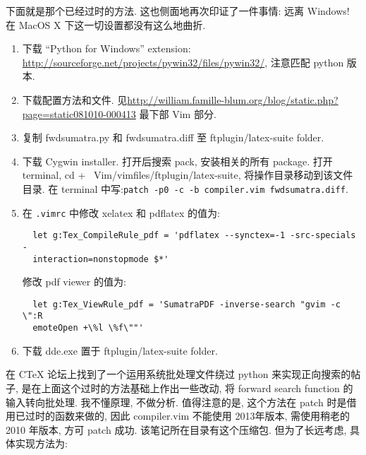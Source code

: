 \documentclass{article}
\begin{document}
下面就是那个已经过时的方法. 这也侧面地再次印证了一件事情: 远离 Windows! 在 MacOS X 下这一切设置都没有这么地曲折.
\begin{enumerate}
  \item 下载 ``Python for Windows'' extension: \hspace{15pt}\url{http://sourceforge.net/projects/pywin32/files/pywin32/}, 注意匹配 python 版本.
  \item 下载配置方法和文件. 见\hspace{15pt}\url{http://william.famille-blum.org/blog/static.php?page=static081010-000413} 最下部 Vim 部分.
\item 复制 fwdsumatra.py 和 fwdsumatra.diff 至 ftplugin/latex-suite folder.
\item 下载 Cygwin installer.  打开后搜索 pack, 安装相关的所有 package. 打开 terminal, cd + ~Vim/vimfiles/ftplugin/latex-suite, 将操作目录移动到该文件目录. 在 terminal 中写:\verb`patch -p0 -c -b compiler.vim fwdsumatra.diff`.
\item 在 \verb`.vimrc` 中修改 xelatex 和 pdflatex 的值为:
  \begin{verbatim}
  let g:Tex_CompileRule_pdf = 'pdflatex --synctex=-1 -src-specials -
  interaction=nonstopmode $*' 
  \end{verbatim}
  修改 pdf viewer 的值为:
  \begin{verbatim}
  let g:Tex_ViewRule_pdf = 'SumatraPDF -inverse-search "gvim -c \":R
  emoteOpen +\%l \%f\""'
  \end{verbatim}
\item 下载 dde.exe 置于 ftplugin/latex-suite folder.
\end{enumerate}
在 CTeX 论坛上找到了一个运用系统批处理文件绕过 python 来实现正向搜索的帖子, 是在上面这个过时的方法基础上作出一些改动, 将 forward search function 的输入转向批处理. 我不懂原理, 不做分析. 
值得注意的是, 这个方法在 patch 时是借用已过时的函数来做的, 因此 compiler.vim 不能使用 2013年版本, 需使用稍老的 2010 年版本, 方可 patch 成功. 该笔记所在目录有这个压缩包. 但为了长远考虑, 具体实现方法为:
\end{document}
